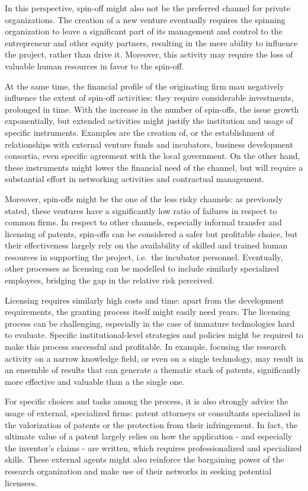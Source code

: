 In this perspective, spin-off might also not be the preferred channel for private organizations. The creation of a new venture eventually requires the spinning organization to leave a significant part of its management and control to the entrepreneur and other equity partners, resulting in the mere ability to influence the project, rather than drive it. Moreover, this activity may require the loss of valuable human resources in favor to the spin-off. 

At the same time, the financial profile of the originating firm mau negatively influence the extent of spin-off activities: they require considerable investments, prolonged in time. With the increase in the number of spin-offs, the issue growth exponentially, but extended activities might justify the institution and usage of specific instruments. Examples are the creation of, or the establishment of relationships with external venture funds and incubators, business development consortia, even specific agreement with the local government. On the other hand, these instruments might lower the financial need of the channel, but will require a substantial effort in networking activities and contractual management.

Moreover, spin-offs might be the one of the less risky channels: as previously stated, these ventures have a significantly low ratio of failures in respect to common firms. In respect to other channels, especially informal transfer and licensing of patents, spin-offs can be considered a safer but profitable choice, but their effectiveness largely rely on the availability of skilled and trained human resources in supporting the project, i.e.\ the incubator personnel. Eventually, other processes as licensing can be modelled to include similarly specialized employees, bridging the gap in the relative risk perceived.

Licensing requires similarly high costs and time: apart from the development requirements, the granting process itself might easily need years. The licensing process can be challenging, especially in the case of immature technologies hard to evaluate. Specific institutional-level strategies and policies might be required to make this process successful and profitable. In example, focusing the research activity on a narrow knowledge field, or even on a single technology, may result in an ensemble of results that can generate a thematic stack of patents, significantly more effective and valuable than a the single one.

For specific choices and tasks among the process, it is also strongly advice the usage of external, specialized firms: patent attorneys or consultants specialized in the valorization of patents or the protection from their infringement. In fact, the ultimate value of a patent largely relies on how the application - and especially the inventor's claims - are written, which requires professionalized and specialized skills. These external agents might also reinforce the bargaining power of the research organization and make use of their networks in seeking potential licensees. 


